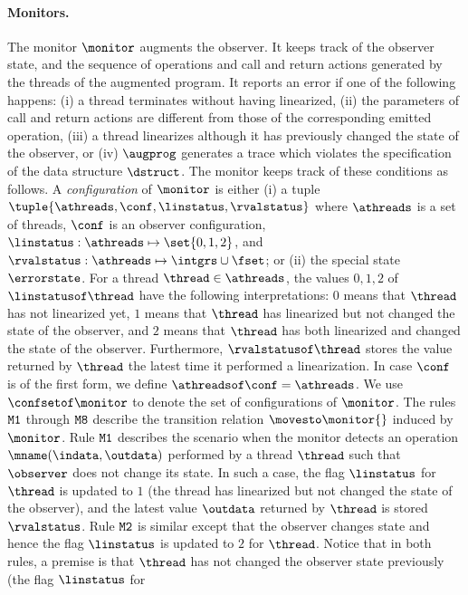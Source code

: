 \paragraph{Monitors.}
%
The monitor $\monitor$ augments the observer. It keeps track of 
the observer state, and the sequence of operations and
call and return actions generated by the threads of the augmented program.
It reports
an error if one of the following happens:
(i)
a thread terminates without having linearized,
(ii) 
the parameters of call and return actions are different from those of
the corresponding emitted operation,
%
(iii)
a thread linearizes although it has previously changed the state
of the observer, or
%
(iv)
$\augprog$ generates a trace which violates the specification of the data
structure $\dstruct$.
%
The monitor keeps track of these conditions as follows.
%
A {\it configuration} of $\monitor$ is either
(i) a tuple
$\tuple{\athreads,\conf,\linstatus,\rvalstatus}$
where $\athreads$ is a set of threads,
$\conf$ is an observer configuration,
$\linstatus:\athreads\mapsto\set{0,1,2}$, and
$\rvalstatus:\athreads\mapsto\intgrs\cup\fset$;
or
(ii) the special state $\errorstate$.
%
For a thread $\thread\in\athreads$, 
the values $0,1,2$ of 
$\linstatusof\thread$ have the following interpretations:
$0$ means that $\thread$ has not linearized yet,
$1$ means that $\thread$ has linearized but not changed the state of the observer,
and
$2$ means that $\thread$ has both linearized and changed 
the state of the observer.
%
Furthermore, 
$\rvalstatusof\thread$ stores the value returned by $\thread$ the latest
time it performed a linearization.
%
In case $\conf$ is of the first form,
we define $\athreadsof\conf=\athreads$.
%
We use $\confsetof\monitor$ to denote the set of configurations
of $\monitor$.
%
The rules
${\tt M1}$ through ${\tt M8}$
describe the transition relation
$\movesto\monitor{}$ induced by $\monitor$. 
%
Rule ${\tt M1}$ describes the scenario when the monitor 
detects an operation $\mname(\indata,\outdata)$ performed by 
a thread $\thread$ such that $\observer$ does not change its state.
%
In such a case, the flag $\linstatus$ for $\thread$
is updated to $1$ (the thread has linearized but not changed the state
of the observer), and the latest value $\outdata$
returned by $\thread$ is stored $\rvalstatus$.
%
Rule ${\tt M2}$ is similar except that the observer changes state
and hence the flag $\linstatus$ is updated to $2$ for $\thread$.
%
Notice that in both rules, a premise is that $\thread$ has not
changed the observer state previously (the flag $\linstatus$ for
